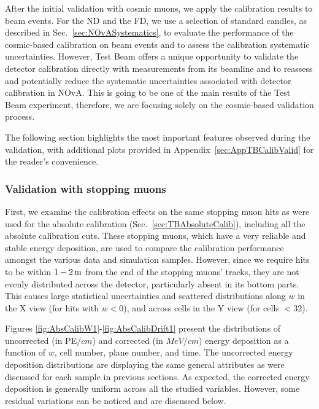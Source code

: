 After the initial validation with cosmic muons, we apply the calibration results to beam events. For the \gls{ND} and the \gls{FD}, we use a selection of standard candles, as described in Sec.~\ref{sec:NOvASystematics}, to evaluate the performance of the cosmic-based calibration on beam events and to assess the calibration systematic uncertainties. However, Test Beam offers a unique opportunity to validate the detector calibration directly with measurements from its beamline and to reassess and potentially reduce the systematic uncertainties associated with detector calibration in \gls{NOvA}. This is going to be one of the main results of the Test Beam experiment, therefore, we are focusing solely on the cosmic-based validation process.

The following section highlights the most important features observed during the validation, with additional plots provided in Appendix~\ref{sec:AppTBCalibValid} for the reader's convenience.

\subsubsection{Validation with stopping muons}

First, we examine the calibration effects on the same stopping muon hits as were used for the absolute calibration (Sec.~\ref{sec:TBAbsoluteCalib}), including all the absolute calibration cuts. These stopping muons, which have a very reliable and stable energy deposition, are used to compare the calibration performance amongst the various data and simulation samples. However, since we require hits to be within $\unit[1-2]{m}$ from the end of the stopping muons' tracks, they are not evenly distributed across the detector, particularly absent in its bottom parts. This causes large statistical uncertainties and scattered distributions along $w$ in the X view (for hits with $w<0$), and across cells in the Y view (for cells $<32$).

Figures \ref{fig:AbsCalibW1}-\ref{fig:AbsCalibDrift1} present the distributions of uncorrected (in \gls{PE}$\unit{/cm}$) and corrected (in $\unit{MeV/cm}$) energy deposition as a function of $w$, cell number, plane number, and time. The uncorrected energy deposition distributions are displaying the same general attributes as were discussed for each sample in previous sections. As expected, the corrected energy deposition is generally uniform across all the studied variables. However, some residual variations can be noticed and are discussed below.

